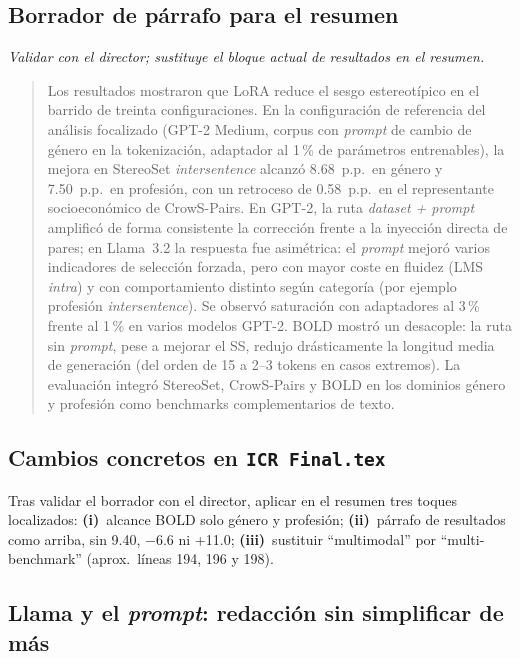 \documentclass[11pt,a4paper]{article}
\newcommand{\archivo}[1]{\texttt{\nolinkurl{#1}}}
\begin{document}
\subsection{Borrador de párrafo para el resumen}

\textit{Validar con el director; sustituye el bloque actual de resultados en el resumen.}

\begin{quote}
\small
Los resultados mostraron que LoRA reduce el sesgo estereotípico en el barrido de treinta
configuraciones. En la configuración de referencia del análisis focalizado (GPT-2 Medium, corpus con
\emph{prompt} de cambio de género en la tokenización, adaptador al 1\,\% de parámetros entrenables),
la mejora en StereoSet \emph{intersentence} alcanzó 8.68~p.p.\ en género y 7.50~p.p.\ en profesión,
con un retroceso de 0.58~p.p.\ en el representante socioeconómico de CrowS-Pairs. En GPT-2, la ruta
\emph{dataset + prompt} amplificó de forma consistente la corrección frente a la inyección directa de
pares; en Llama~3.2 la respuesta fue asimétrica: el \emph{prompt} mejoró varios indicadores de
selección forzada, pero con mayor coste en fluidez (LMS \emph{intra}) y con comportamiento distinto
según categoría (por ejemplo profesión \emph{intersentence}). Se observó saturación con adaptadores al
3\,\% frente al 1\,\% en varios modelos GPT-2. BOLD mostró un desacople: la ruta sin \emph{prompt}, pese
a mejorar el SS, redujo drásticamente la longitud media de generación (del orden de 15 a 2--3 tokens en
casos extremos). La evaluación integró StereoSet, CrowS-Pairs y BOLD en los dominios género y
profesión como benchmarks complementarios de texto.
\end{quote}

\subsection[Cambios concretos en ICR Final.tex]{Cambios concretos en \archivo{ICR Final.tex}}

Tras validar el borrador con el director, aplicar en el resumen tres toques localizados:
\textbf{(i)}~alcance BOLD solo género y profesión; \textbf{(ii)}~párrafo de resultados como arriba, sin
9.40, $-$6.6 ni +11.0; \textbf{(iii)}~sustituir ``multimodal'' por ``multi-benchmark'' (aprox.\ líneas
194, 196 y 198).

\subsection{Llama y el \emph{prompt}: redacción sin simplificar de más}
\end{document}
